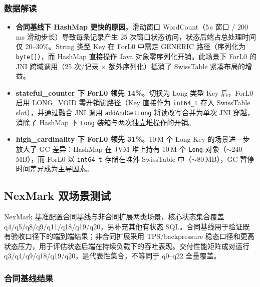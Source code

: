 \documentclass[a4paper,11pt]{article}
\begin{document}
\subsubsection{数据解读}

\begin{itemize}
  \item \textbf{合同基线下 HashMap 更快的原因}。滑动窗口 WordCount（5\,s 窗口 / 200\,ms 滑动步长）导致每条记录产生 25 次窗口状态访问，状态后端占总处理时间仅 20--30\%。String 类型 Key 在 ForL0 中需走 GENERIC 路径（序列化为 \texttt{byte[]}），而 HashMap 直接操作 Java 对象零序列化开销。此场景下 ForL0 的 JNI 跨域调用（25 次/记录 $\times$ 额外序列化）抵消了 SwissTable 紧凑布局的增益。
  \item \textbf{stateful\_counter 下 ForL0 领先 14\%}。切换为 Long 类型 Key 后，ForL0 启用 LONG\_VOID 零开销键路径（Key 直接作为 \texttt{int64\_t} 存入 SwissTable slot），并通过融合 JNI 调用 \texttt{addAndGetLong} 将读改写合并为单次 JNI 穿越，消除了 HashMap 下 \texttt{Long} 装箱与两次独立堆操作的开销。
  \item \textbf{high\_cardinality 下 ForL0 领先 31\%}。10\,M 个 Long Key 的场景进一步放大了 GC 差异：HashMap 在 JVM 堆上持有 10\,M 个 \texttt{Long} 对象（$\sim$240\,MB），而 ForL0 以 \texttt{int64\_t} 存储在堆外 SwissTable 中（$\sim$80\,MB），GC 暂停时间差异成为主导因素。
\end{itemize}

\subsection{NexMark 双场景测试}

NexMark 基准配置合同基线与非合同扩展两类场景，核心状态集合覆盖 q4/q5/q8/q9/q11/q18/q19/q20，另补充其他有状态 SQL。合同基线用于验证既有验收口径下的端到端结果；非合同扩展采用 TPS/backpressure 稳态口径和更高状态压力，用于评估状态后端在持续负载下的吞吐表现。交付性能矩阵成对运行 q3/q4/q9/q18/q19/q20，是代表性集合，不等同于 q0--q22 全量覆盖。

\subsubsection{合同基线结果}
\end{document}
